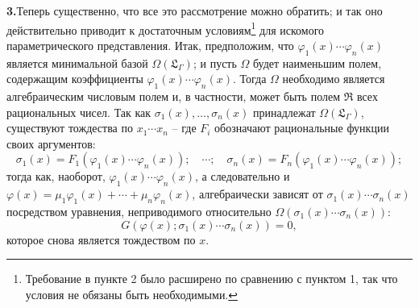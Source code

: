 \documentclass[11pt]{article}
\begin{document}
\noindent\textbf{3.}\quad Теперь существенно, что все это рассмотрение можно обратить; и так оно действительно приводит к достаточным условиям\footnote{Требование в пункте 2 было расширено по сравнению с пунктом 1, так что условия не обязаны быть необходимыми.} для искомого параметрического представления. Итак, предположим, что $\varphi_1(x)\cdots\varphi_n(x)$ является минимальной базой $\Omega(\mathfrak L_\Gamma)$; и пусть $\Omega$ будет наименьшим полем, содержащим коэффициенты $\varphi_1(x)\cdots\varphi_n(x)$. Тогда $\Omega$ необходимо является алгебраическим числовым полем и, в частности, может быть полем $\mathfrak R$ всех рациональных чисел. Так как $\sigma_1(x),\ldots,\sigma_n(x)$ принадлежат $\Omega(\mathfrak L_\Gamma)$, существуют тождества по $x_1\cdots x_n$ -- где $F_i$ обозначают рациональные функции своих аргументов:
\begin{equation}
\sigma_1(x)=F_1(\varphi_1(x)\cdots\varphi_n(x));\quad \cdots;\quad
\sigma_n(x)=F_n(\varphi_1(x)\cdots\varphi_n(x));
\tag{5}
\end{equation}
тогда как, наоборот, $\varphi_1(x)\cdots\varphi_n(x)$, а следовательно и $\varphi(x)=\mu_1\varphi_1(x)+\cdots+\mu_n\varphi_n(x)$, алгебраически зависят от $\sigma_1(x)\cdots\sigma_n(x)$ посредством уравнения, неприводимого относительно $\Omega(\sigma_1(x)\cdots\sigma_n(x))$:
\begin{equation}
G(\varphi(x);\sigma_1(x)\cdots\sigma_n(x))=0,
\tag{6}
\end{equation}
которое снова является тождеством по $x$.
\end{document}
